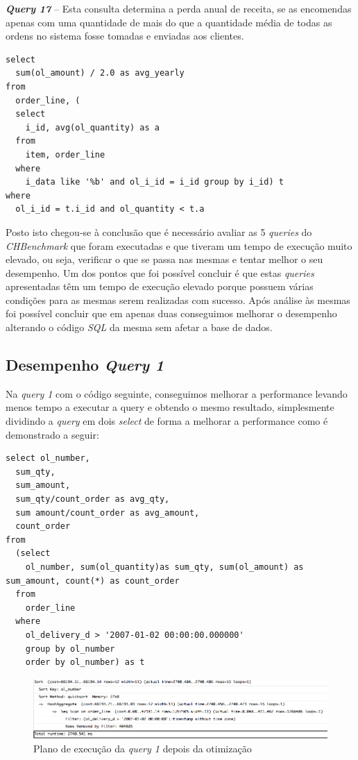 \textbf{\textit{Query 17}} – Esta consulta determina a perda anual de receita, se as encomendas apenas com uma quantidade de mais do que a quantidade média de todas as ordens no sistema fosse tomadas e enviadas aos clientes.

\begin{verbatim}
select
  sum(ol_amount) / 2.0 as avg_yearly
from
  order_line, (
  select
    i_id, avg(ol_quantity) as a
  from
    item, order_line
  where
    i_data like '%b' and ol_i_id = i_id group by i_id) t
where
  ol_i_id = t.i_id and ol_quantity < t.a
\end{verbatim}


Posto isto chegou-se à conclusão que é necessário avaliar as 5 \textit{queries} do \textit{CHBenchmark} que foram executadas e que tiveram um tempo de execução muito elevado, ou seja, verificar o que se passa nas mesmas e tentar melhor o seu desempenho. Um dos pontos que foi possível concluir é que estas \textit{queries} apresentadas têm um tempo de execução elevado porque possuem várias condições para as mesmas serem realizadas com sucesso. Após análise às mesmas foi possível concluir que em apenas duas conseguimos melhorar o desempenho alterando o código \textit{SQL} da mesma sem afetar a base de dados.\\

\newpage

\subsection{Desempenho \textit{Query 1}}

Na \textit{query 1} com o código seguinte, conseguimos melhorar a performance levando menos tempo a executar a query e obtendo o mesmo resultado, simplesmente dividindo a \textit{query} em dois \textit{select} de forma a melhorar a performance como é demonstrado a seguir:

\begin{verbatim}
select ol_number,
  sum_qty,
  sum_amount,
  sum_qty/count_order as avg_qty,
  sum amount/count_order as avg_amount,
  count_order
from
  (select
    ol_number, sum(ol_quantity)as sum_qty, sum(ol_amount) as sum_amount, count(*) as count_order
  from
    order_line
  where
    ol_delivery_d > '2007-01-02 00:00:00.000000'
    group by ol_number
    order by ol_number) as t
\end{verbatim}

\begin{figure}[ht!]
\centering
\includegraphics[width=\textwidth]{img/00_query1_pos}
\caption{Plano de execução da \textit{query 1} depois da otimização \label{overflow}}
\end{figure}

